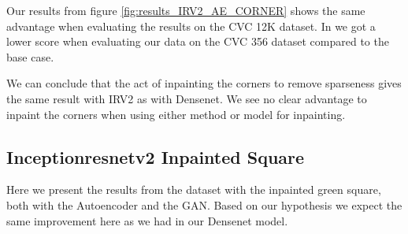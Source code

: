 Our results from figure \ref{fig:results_IRV2_AE_CORNER} shows the same advantage when evaluating the results on the CVC 12K dataset.
In we got a lower score when evaluating our data on the CVC 356 dataset compared to the base case.

We can conclude that the act of inpainting the corners to remove sparseness gives the same result with IRV2 as with Densenet.
We see no clear advantage to inpaint the corners when using either method or model for inpainting.







\subsection{Inceptionresnetv2 Inpainted Square}

Here we present the results from the dataset with the inpainted green square, both with the Autoencoder and the GAN.  
Based on our hypothesis we expect the same improvement here as we had in our Densenet model.  
 

